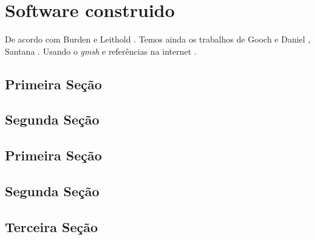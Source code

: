\chapter{Software construido}

\lipsum[1-2]


De acordo com Burden \cite{burden} e Leithold \cite{leithold}. 
Temos ainda os trabalhos de Gooch e Daniel \cite{gooch,daniel}, 
Santana \cite{santana}. Usando o \emph{gmsh} \cite{gmsh} e 
referências na internet \cite{wiki:quadrature}.

\section{Primeira Seção}

\lipsum[3-4]


\section{Segunda Seção}

\lipsum[5-6]


\section{Primeira Seção}

\lipsum[3-4]


\section{Segunda Seção}

\lipsum[5-6]


\section{Terceira Seção}

